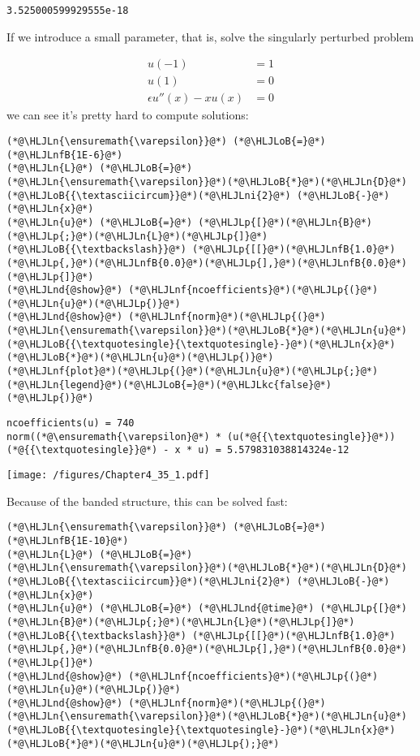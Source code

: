 \documentclass[12pt,a4paper]{article}
\newcommand{\HLJLkc}[1]{\textcolor[RGB]{59,151,46}{\textit{#1}}}
\newcommand{\HLJLn}[1]{#1}
\newcommand{\HLJLnd}[1]{\textcolor[RGB]{214,102,97}{#1}}
\newcommand{\HLJLnf}[1]{\textcolor[RGB]{66,102,213}{#1}}
\newcommand{\HLJLnfB}[1]{\textcolor[RGB]{59,151,46}{#1}}
\newcommand{\HLJLni}[1]{\textcolor[RGB]{59,151,46}{#1}}
\newcommand{\HLJLoB}[1]{\textcolor[RGB]{102,102,102}{\textbf{#1}}}
\newcommand{\HLJLp}[1]{#1}
\begin{document}
\begin{lstlisting}
3.525000599929555e-18
\end{lstlisting}


If we introduce a small parameter, that is, solve the singularly perturbed problem


\begin{align*}
u(-1) &= 1\\
u(1) &= 0\\
\epsilon u''(x) - xu(x) &= 0
\end{align*}
we can see it's pretty hard to compute solutions:


\begin{lstlisting}
(*@\HLJLn{\ensuremath{\varepsilon}}@*) (*@\HLJLoB{=}@*) (*@\HLJLnfB{1E-6}@*)
(*@\HLJLn{L}@*) (*@\HLJLoB{=}@*) (*@\HLJLn{\ensuremath{\varepsilon}}@*)(*@\HLJLoB{*}@*)(*@\HLJLn{D}@*)(*@\HLJLoB{{\textasciicircum}}@*)(*@\HLJLni{2}@*) (*@\HLJLoB{-}@*) (*@\HLJLn{x}@*)
(*@\HLJLn{u}@*) (*@\HLJLoB{=}@*) (*@\HLJLp{[}@*)(*@\HLJLn{B}@*)(*@\HLJLp{;}@*)(*@\HLJLn{L}@*)(*@\HLJLp{]}@*) (*@\HLJLoB{{\textbackslash}}@*) (*@\HLJLp{[[}@*)(*@\HLJLnfB{1.0}@*)(*@\HLJLp{,}@*)(*@\HLJLnfB{0.0}@*)(*@\HLJLp{],}@*)(*@\HLJLnfB{0.0}@*)(*@\HLJLp{]}@*)
(*@\HLJLnd{@show}@*) (*@\HLJLnf{ncoefficients}@*)(*@\HLJLp{(}@*)(*@\HLJLn{u}@*)(*@\HLJLp{)}@*)
(*@\HLJLnd{@show}@*) (*@\HLJLnf{norm}@*)(*@\HLJLp{(}@*)(*@\HLJLn{\ensuremath{\varepsilon}}@*)(*@\HLJLoB{*}@*)(*@\HLJLn{u}@*)(*@\HLJLoB{{\textquotesingle}{\textquotesingle}-}@*)(*@\HLJLn{x}@*)(*@\HLJLoB{*}@*)(*@\HLJLn{u}@*)(*@\HLJLp{)}@*)
(*@\HLJLnf{plot}@*)(*@\HLJLp{(}@*)(*@\HLJLn{u}@*)(*@\HLJLp{;}@*) (*@\HLJLn{legend}@*)(*@\HLJLoB{=}@*)(*@\HLJLkc{false}@*)(*@\HLJLp{)}@*)
\end{lstlisting}

\begin{lstlisting}
ncoefficients(u) = 740
norm((*@\ensuremath{\varepsilon}@*) * (u(*@{{\textquotesingle}}@*))(*@{{\textquotesingle}}@*) - x * u) = 5.579831038814324e-12
\end{lstlisting}

\texttt{[image: /figures/Chapter4\_35\_1.pdf]}

Because of the banded structure, this can be solved fast:


\begin{lstlisting}
(*@\HLJLn{\ensuremath{\varepsilon}}@*) (*@\HLJLoB{=}@*) (*@\HLJLnfB{1E-10}@*)
(*@\HLJLn{L}@*) (*@\HLJLoB{=}@*) (*@\HLJLn{\ensuremath{\varepsilon}}@*)(*@\HLJLoB{*}@*)(*@\HLJLn{D}@*)(*@\HLJLoB{{\textasciicircum}}@*)(*@\HLJLni{2}@*) (*@\HLJLoB{-}@*) (*@\HLJLn{x}@*)
(*@\HLJLn{u}@*) (*@\HLJLoB{=}@*) (*@\HLJLnd{@time}@*) (*@\HLJLp{[}@*)(*@\HLJLn{B}@*)(*@\HLJLp{;}@*)(*@\HLJLn{L}@*)(*@\HLJLp{]}@*) (*@\HLJLoB{{\textbackslash}}@*) (*@\HLJLp{[[}@*)(*@\HLJLnfB{1.0}@*)(*@\HLJLp{,}@*)(*@\HLJLnfB{0.0}@*)(*@\HLJLp{],}@*)(*@\HLJLnfB{0.0}@*)(*@\HLJLp{]}@*)
(*@\HLJLnd{@show}@*) (*@\HLJLnf{ncoefficients}@*)(*@\HLJLp{(}@*)(*@\HLJLn{u}@*)(*@\HLJLp{)}@*)
(*@\HLJLnd{@show}@*) (*@\HLJLnf{norm}@*)(*@\HLJLp{(}@*)(*@\HLJLn{\ensuremath{\varepsilon}}@*)(*@\HLJLoB{*}@*)(*@\HLJLn{u}@*)(*@\HLJLoB{{\textquotesingle}{\textquotesingle}-}@*)(*@\HLJLn{x}@*)(*@\HLJLoB{*}@*)(*@\HLJLn{u}@*)(*@\HLJLp{);}@*)
\end{lstlisting}
\end{document}
